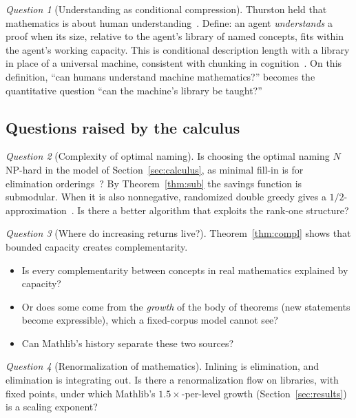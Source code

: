 \documentclass[11pt]{article}
\theoremstyle{remark}
\newtheorem{question}{Question}
\begin{document}
\begin{question}[Understanding as conditional compression]
Thurston held that mathematics is about human understanding~\cite{thurston}. Define: an
agent \emph{understands} a proof when its size, relative to the agent's library of named
concepts, fits within the agent's working capacity. This is conditional description length
with a library in place of a universal machine, consistent with chunking in
cognition~\cite{chase,miller}. On this definition, ``can humans understand machine
mathematics?'' becomes the quantitative question ``can the machine's library be taught?''
\end{question}

\subsection{Questions raised by the calculus}

\begin{question}[Complexity of optimal naming]
Is choosing the optimal naming $N$ NP-hard in the model of Section~\ref{sec:calculus}, as
minimal fill-in is for elimination orderings~\cite{yannakakis}? By Theorem~\ref{thm:sub}
the savings function is submodular. When it is also nonnegative, randomized double greedy
gives a $1/2$-approximation~\cite{buchbinder}. Is there a better algorithm that exploits
the rank-one structure?
\end{question}

\begin{question}[Where do increasing returns live?]
Theorem~\ref{thm:compl} shows that bounded capacity creates complementarity.
\begin{itemize}
\item Is every complementarity between concepts in real mathematics explained by
  capacity?
\item Or does some come from the \emph{growth} of the body of theorems (new statements
  become expressible), which a fixed-corpus model cannot see?
\item Can Mathlib's history separate these two sources?
\end{itemize}
\end{question}

\begin{question}[Renormalization of mathematics]
Inlining is elimination, and elimination is integrating out. Is there a renormalization
flow on libraries, with fixed points, under which Mathlib's $1.5\times$-per-level growth
(Section~\ref{sec:results}) is a scaling exponent?
\end{question}
\end{document}
